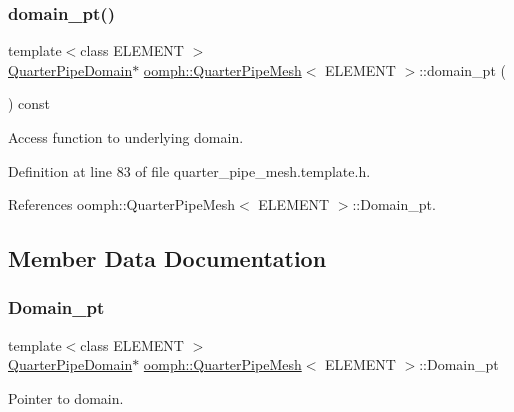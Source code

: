 \subsubsection{\texorpdfstring{domain\+\_\+pt()}{domain\_pt()}\hspace{0.1cm}{\footnotesize\ttfamily [2/2]}}
{\footnotesize\ttfamily template$<$class E\+L\+E\+M\+E\+NT $>$ \\
\hyperlink{classoomph_1_1QuarterPipeDomain}{Quarter\+Pipe\+Domain}$\ast$ \hyperlink{classoomph_1_1QuarterPipeMesh}{oomph\+::\+Quarter\+Pipe\+Mesh}$<$ E\+L\+E\+M\+E\+NT $>$\+::domain\+\_\+pt (\begin{DoxyParamCaption}{ }\end{DoxyParamCaption}) const\hspace{0.3cm}{\ttfamily [inline]}}



Access function to underlying domain. 



Definition at line 83 of file quarter\+\_\+pipe\+\_\+mesh.\+template.\+h.



References oomph\+::\+Quarter\+Pipe\+Mesh$<$ E\+L\+E\+M\+E\+N\+T $>$\+::\+Domain\+\_\+pt.



\subsection{Member Data Documentation}
\mbox{\label{classoomph_1_1QuarterPipeMesh_a1b3656a71bc9f6159aa237d3a76d5a15}} 
\subsubsection{\texorpdfstring{Domain\+\_\+pt}{Domain\_pt}}
{\footnotesize\ttfamily template$<$class E\+L\+E\+M\+E\+NT $>$ \\
\hyperlink{classoomph_1_1QuarterPipeDomain}{Quarter\+Pipe\+Domain}$\ast$ \hyperlink{classoomph_1_1QuarterPipeMesh}{oomph\+::\+Quarter\+Pipe\+Mesh}$<$ E\+L\+E\+M\+E\+NT $>$\+::Domain\+\_\+pt\hspace{0.3cm}{\ttfamily [protected]}}



Pointer to domain. 



